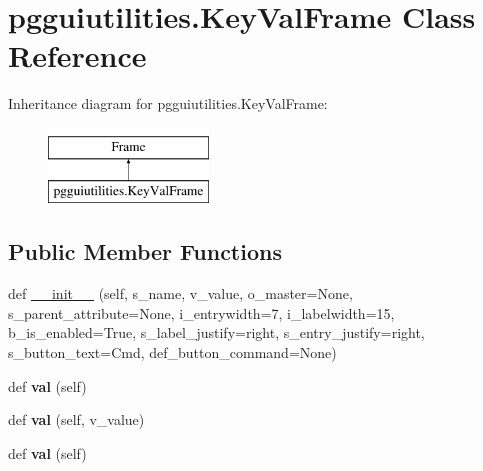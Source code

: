 \hypertarget{classpgguiutilities_1_1KeyValFrame}{}\section{pgguiutilities.\+Key\+Val\+Frame Class Reference}
\label{classpgguiutilities_1_1KeyValFrame}
Inheritance diagram for pgguiutilities.\+Key\+Val\+Frame\+:\begin{figure}[H]
\begin{center}
\leavevmode
\includegraphics[height=2.000000cm]{classpgguiutilities_1_1KeyValFrame}
\end{center}
\end{figure}
\subsection*{Public Member Functions}
\begin{DoxyCompactItemize}
\item 
def \hyperlink{classpgguiutilities_1_1KeyValFrame_a7788f433f2bd227c289c16dffee3da71}{\+\_\+\+\_\+init\+\_\+\+\_\+} (self, s\+\_\+name, v\+\_\+value, o\+\_\+master=None, s\+\_\+parent\+\_\+attribute=None, i\+\_\+entrywidth=7, i\+\_\+labelwidth=15, b\+\_\+is\+\_\+enabled=True, s\+\_\+label\+\_\+justify=\textquotesingle{}right\textquotesingle{}, s\+\_\+entry\+\_\+justify=\textquotesingle{}right\textquotesingle{}, s\+\_\+button\+\_\+text=\textquotesingle{}Cmd\textquotesingle{}, def\+\_\+button\+\_\+command=None)
\item 
def {\bfseries val} (self)\hypertarget{classpgguiutilities_1_1KeyValFrame_a4860eae118c334c1a788f8fa4393d02b}{}\label{classpgguiutilities_1_1KeyValFrame_a4860eae118c334c1a788f8fa4393d02b}

\item 
def {\bfseries val} (self, v\+\_\+value)\hypertarget{classpgguiutilities_1_1KeyValFrame_ad353c861c2c463ae8bd22c3aa19c4703}{}\label{classpgguiutilities_1_1KeyValFrame_ad353c861c2c463ae8bd22c3aa19c4703}

\item 
def {\bfseries val} (self)\hypertarget{classpgguiutilities_1_1KeyValFrame_a4860eae118c334c1a788f8fa4393d02b}{}\label{classpgguiutilities_1_1KeyValFrame_a4860eae118c334c1a788f8fa4393d02b}

\end{DoxyCompactItemize}


